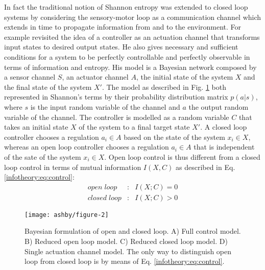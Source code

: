 In fact the traditional notion of Shannon entropy was extended to closed loop
systems by considering the sensory-motor loop as a communication channel which 
extends in time to propagate information from and to the environment.
For example \citet{Touchette2004} revisited the idea of a controller as
 an actuation channel that transforms input states to desired output states.
He also gives necessary and sufficient conditions for a system to be perfectly
 controllable and perfectly observable in terms of information and entropy.
His model is a Bayesian network composed by a sensor channel $S$,
an actuator channel $A$, the initial state of the system $X$ and the final
state of the system $X'$. The model as described in Fig. \ref{fig:tishby1} both
represented in Shannon's terms by their probability distribution matrix $p(a|s)$,
where $s$ is the input random variable of the channel and $a$ the output random
variable of the channel.
The controller is modelled as a random variable $C$ that takes an initial state
 $X$ of the system to a final target state $X'$. A closed loop controller chooses
a regulation $a_i \in A$ based on the state of the system $x_i \in X$, whereas an open loop
 controller chooses a regulation $a_i \in A$ that is independent of the sate of the system $x_i \in X$.
Open loop control is thus different from a closed loop control in terms of
mutual information $I(X,C)$ as described in Eq. \ref{infotheory:eq:control}: 
\begin{eqnarray}
open \; loop &:& I(X;C)=0\\
closed \; loop&:& I(X;C)>0
\label{infotheory:eq:control}
\end{eqnarray}

\begin{figure}[!htbp]
\begin{center}
\texttt{[image: ashby/figure-2]}
\caption[Bayes formulation in traditional control]{
Bayesian formulation of open and closed loop.
A) Full control model.
B) Reduced open loop model.
C) Reduced closed loop model.
D) Single actuation channel model.
The only way to distinguish open loop from closed loop is by means of Eq. \ref{infotheory:eq:control}.
\label{fig:tishby1}
}
\end{center}

\end{figure}

